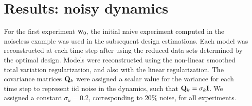 \documentclass[final,leqno,onefignum,onetabnum]{siamltexmm}
\begin{document}
\section{Results: noisy  dynamics}
\label{sec: Example2}
For the first experiment ${\bf{w}}_0$, the initial naive experiment computed in the noiseless example was used in the subsequent design estimations. Each model was reconstructed at each time step after using the reduced data sets determined by the optimal design. Models were reconstructed using the non-linear smoothed total variation regularization, and also with the linear regularization. 
The covariance matrices ${\bf{Q}}_k$ were assigned a scalar value for the variance for each time step to represent iid noise in the dynamics, such that ${\bf{Q}}_k = \sigma_k {\bf{I}}$. We assigned a constant $\sigma_k = 0.2$, corresponding to $20\%$ noise, for all experiments.
\end{document}

